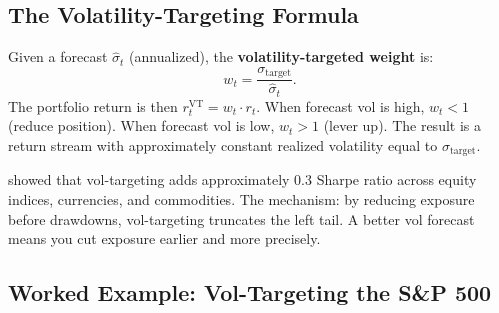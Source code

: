 \subsection{The Volatility-Targeting Formula}
\label{subsec:vol-target-formula}

Given a forecast $\hat\sigma_t$ (annualized), the \textbf{volatility-targeted weight} is:
\begin{equation}
\label{eq:vol-target-weight}
w_t = \frac{\sigma_{\text{target}}}{\hat\sigma_t}.
\end{equation}
The portfolio return is then $r_t^{\text{VT}} = w_t \cdot r_t$.
When forecast vol is high, $w_t < 1$ (reduce position).
When forecast vol is low, $w_t > 1$ (lever up).
The result is a return stream with approximately constant realized volatility equal to $\sigma_{\text{target}}$.

\begin{intuition}
\citet{MoreiraMuir2017} showed that vol-targeting adds approximately 0.3 Sharpe ratio across equity indices, currencies, and commodities.
The mechanism: by reducing exposure before drawdowns, vol-targeting truncates the left tail.
A better vol forecast means you cut exposure earlier and more precisely.
\end{intuition}

\subsection{Worked Example: Vol-Targeting the S\&P 500}
\label{subsec:vol-target-example}

